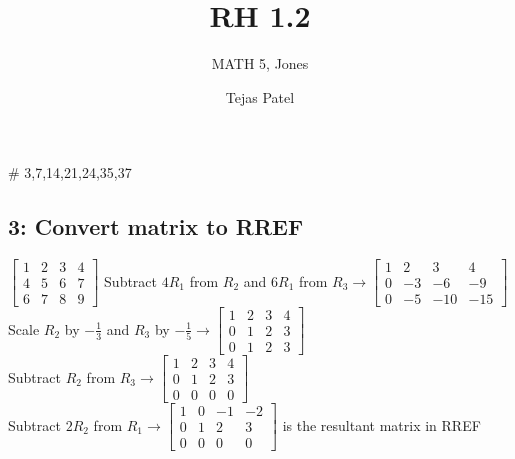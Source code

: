 \documentclass{article}
\title{RH 1.2}
\author{MATH 5, Jones}
\date{Tejas Patel}
\begin{document}
\maketitle
\# 3,7,14,21,24,35,37
\subsection*{3: Convert matrix to RREF}
$
\left[\begin{array}{ccc|c}
    1 & 2 & 3 & 4 \\
    4 & 5 & 6 & 7 \\
    6 & 7 & 8 & 9 
\end{array}\right]
$ Subtract $4R_1$ from $R_2$ and $6R_1$ from $R_3 \rightarrow
\left[\begin{array}{ccc|c}
    1 & 2 & 3 & 4 \\
    0 & -3 & -6 & -9 \\
    0 & -5 & -10 & -15 
\end{array}\right]
$\\[0.1in]Scale $R_2$ by $-\frac{1}{3}$ and $R_3$ by $-\frac{1}{5} \rightarrow 
\left[\begin{array}{ccc|c}
    1 & 2 & 3 & 4 \\
    0 & 1 & 2 & 3 \\
    0 & 1 & 2 & 3 
\end{array}\right]$ \\[0.1in] Subtract $R_2$ from $R_3 \rightarrow
\left[\begin{array}{ccc|c}
    1 & 2 & 3 & 4 \\
    0 & 1 & 2 & 3 \\
    0 & 0 & 0 & 0 
\end{array}\right]$ \\[0.1in] Subtract $2R_2$ from $R_1 \rightarrow
\boxed{\left[\begin{array}{ccc|c}
    1 & 0 & -1 & -2 \\
    0 & 1 & 2 & 3 \\
    0 & 0 & 0 & 0 
\end{array}\right]}
$ is the resultant matrix in RREF
\end{document}
